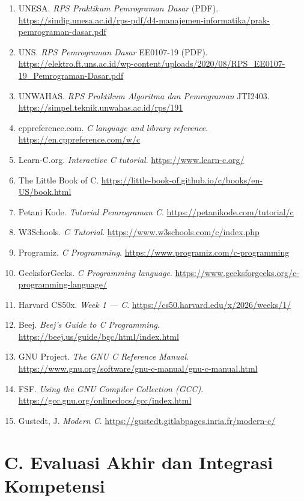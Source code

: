 \begin{enumerate}[leftmargin=*]
  \item UNESA. \textit{RPS Praktikum Pemrograman Dasar} (PDF). \url{https://sindig.unesa.ac.id/rps-pdf/d4-manajemen-informatika/prak-pemrograman-dasar.pdf}
  \item UNS. \textit{RPS Pemrograman Dasar} EE0107-19 (PDF). \url{https://elektro.ft.uns.ac.id/wp-content/uploads/2020/08/RPS_EE0107-19_Pemrograman-Dasar.pdf}
  \item UNWAHAS. \textit{RPS Praktikum Algoritma dan Pemrograman} JTI2403. \url{https://simpel.teknik.unwahas.ac.id/rps/191}
  \item cppreference.com. \textit{C language and library reference}. \url{https://en.cppreference.com/w/c}
  \item Learn-C.org. \textit{Interactive C tutorial}. \url{https://www.learn-c.org/}
  \item The Little Book of C. \url{https://little-book-of.github.io/c/books/en-US/book.html}
  \item Petani Kode. \textit{Tutorial Pemrograman C}. \url{https://petanikode.com/tutorial/c}
  \item W3Schools. \textit{C Tutorial}. \url{https://www.w3schools.com/c/index.php}
  \item Programiz. \textit{C Programming}. \url{https://www.programiz.com/c-programming}
  \item GeeksforGeeks. \textit{C Programming language}. \url{https://www.geeksforgeeks.org/c-programming-language/}
  \item Harvard CS50x. \textit{Week 1 --- C}. \url{https://cs50.harvard.edu/x/2026/weeks/1/}
  \item Beej. \textit{Beej's Guide to C Programming}. \url{https://beej.us/guide/bgc/html/index.html}
  \item GNU Project. \textit{The GNU C Reference Manual}. \url{https://www.gnu.org/software/gnu-c-manual/gnu-c-manual.html}
  \item FSF. \textit{Using the GNU Compiler Collection (GCC)}. \url{https://gcc.gnu.org/onlinedocs/gcc/index.html}
  \item Gustedt, J. \textit{Modern C}. \url{https://gustedt.gitlabpages.inria.fr/modern-c/}
\end{enumerate}

\section*{C. Evaluasi Akhir dan Integrasi Kompetensi}

